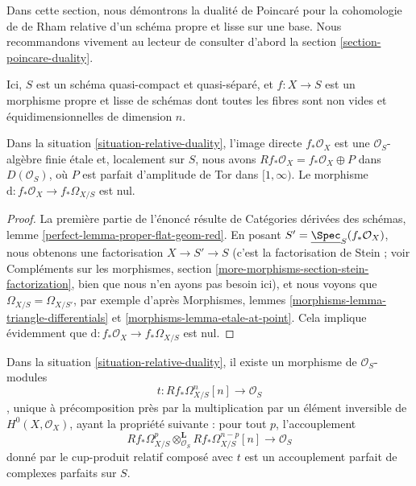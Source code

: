 \noindent
Dans cette section, nous démontrons la dualité de Poincaré pour la cohomologie de de Rham relative
d'un schéma propre et lisse sur une base. Nous recommandons vivement au lecteur
de consulter d'abord la section \ref{section-poincare-duality}.

\begin{situation}
\label{situation-relative-duality}
Ici, $S$ est un schéma quasi-compact et quasi-séparé, et
$f : X \to S$ est un morphisme propre et lisse de schémas dont toutes les
fibres sont non vides et équidimensionnelles de dimension $n$.
\end{situation}

\begin{lemma}
\label{lemma-relative-bottom-part-degenerates}
Dans la situation \ref{situation-relative-duality}, l'image directe
$f_*\mathcal{O}_X$ est une $\mathcal{O}_S$-algèbre finie étale
et, localement sur $S$, nous avons $Rf_*\mathcal{O}_X = f_*\mathcal{O}_X \oplus P$
dans $D(\mathcal{O}_S)$, où $P$ est parfait d'amplitude de Tor dans $[1, \infty)$.
Le morphisme $\text{d} : f_*\mathcal{O}_X \to f_*\Omega_{X/S}$ est nul.
\end{lemma}

\begin{proof}
La première partie de l'énoncé résulte de
Catégories dérivées des schémas, lemme \ref{perfect-lemma-proper-flat-geom-red}.
En posant $S' = \underline{\Spec}_S(f_*\mathcal{O}_X)$, nous obtenons une factorisation
$X \to S' \to S$ (c'est la factorisation de Stein ; voir
Compléments sur les morphismes, section \ref{more-morphisms-section-stein-factorization},
bien que nous n'en ayons pas besoin ici),
et nous voyons que $\Omega_{X/S} = \Omega_{X/S'}$, par exemple d'après
Morphismes, lemmes \ref{morphisms-lemma-triangle-differentials} et
\ref{morphisms-lemma-etale-at-point}. Cela implique évidemment que
$\text{d} : f_*\mathcal{O}_X \to f_*\Omega_{X/S}$ est nul.
\end{proof}

\begin{lemma}
\label{lemma-relative-duality-hodge}
Dans la situation \ref{situation-relative-duality}, il existe un morphisme de
$\mathcal{O}_S$-modules
$$
t : Rf_*\Omega^n_{X/S}[n] \longrightarrow \mathcal{O}_S
$$,
unique à précomposition près par la multiplication par un élément inversible de
$H^0(X, \mathcal{O}_X)$, ayant la propriété suivante : pour tout $p$, l'accouplement
$$
Rf_*\Omega^p_{X/S}
\otimes_{\mathcal{O}_S}^\mathbf{L}
Rf_*\Omega^{n - p}_{X/S}[n]
\longrightarrow
\mathcal{O}_S
$$
donné par le cup-produit relatif composé avec $t$
est un accouplement parfait de complexes parfaits sur $S$.
\end{lemma}

